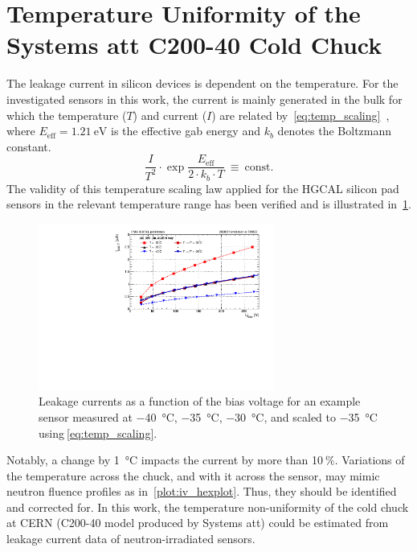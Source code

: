 \section{Temperature Uniformity of the Systems att C200-40 Cold Chuck}
\label{appendix:chuck_temp}
The leakage current in silicon devices is dependent on the temperature.
For the investigated sensors in this work, the current is mainly generated in the bulk for which the temperature ($T$) and current ($I$) are related by~\ref{eq:temp_scaling}~\cite{Chilingarov_2013}, where $E_\text{eff}=\SI{1.21}{\electronvolt}$ is the effective gab energy and $k_b$ denotes the Boltzmann constant.
\begin{equation}
    \frac{I}{T^2}\cdot \exp{\frac{E_\text{eff}}{2\cdot k_b \cdot T}}~\equiv~\text{const.}
    \label{eq:temp_scaling}
\end{equation}
The validity of this temperature scaling law applied for the HGCAL silicon pad sensors in the relevant temperature range has been verified and is illustrated in~\ref{plot:iv_tempscaling}.
\begin{figure}[h]
	\centering
	\includegraphics[width=0.69\textwidth]{plots/iv_temp_scaling/iv_overlay_ch24.pdf}
	\caption{
		Leakage currents as a function of the bias voltage for an example sensor measured at \SI{-40}{\celsius}, \SI{-35}{\celsius}, \SI{-30}{\celsius}, and scaled to \SI{-35}{\celsius} using$~$\ref{eq:temp_scaling}.
		}
	\label{plot:iv_tempscaling}
	\end{figure}
Notably, a change by \SI{1}{\celsius} impacts the current by more than 10$~\%$. 
Variations of the temperature across the chuck, and with it across the sensor, may mimic neutron fluence profiles as in~\ref{plot:iv_hexplot}. 
Thus, they should be identified and corrected for.\newline
In this work, the temperature non-uniformity of the cold chuck at CERN (C200-40 model produced by Systems att) could be estimated from leakage current data of neutron-irradiated sensors.
